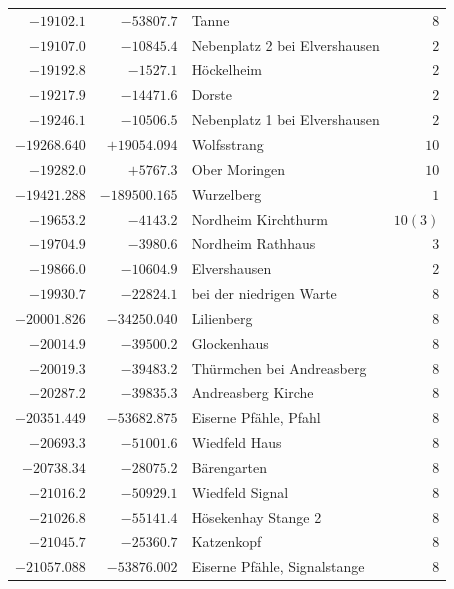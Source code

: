 \begin{center}
\begin{tabular}{r|r|p{170pt}|r}
\(-19102.1\)&\(-53807.7\)&Tanne&\(8\)\\
\(-19107.0\)&\(-10845.4\)&Nebenplatz 2 bei Elvershausen&\(2\)\\
\(-19192.8\)&\(-1527.1\)&Höckelheim&\(2\)\\
\(-19217.9\)&\(-14471.6\)&Dorste&\(2\)\\
\(-19246.1\)&\(-10506.5\)&Nebenplatz 1 bei Elvershausen&\(2\)\\
\(-19268.640\)&\(+19054.094\)&Wolfsstrang&\(10\)\\
\(-19282.0\)&\(+5767.3\)&Ober Moringen&\(10\)\\
\(-19421.288\)&\(-189500.165\)&Wurzelberg&\(1\)\\
\(-19653.2\)&\(-4143.2\)&Nordheim Kirchthurm&\(10 (3)\)\\
\(-19704.9\)&\(-3980.6\)&Nordheim Rathhaus&\(3\)\\
\(-19866.0\)&\(-10604.9\)&Elvershausen&\(2\)\\
\(-19930.7\)&\(-22824.1\)&bei der niedrigen Warte&\(8\)\\
\(-20001.826\)&\(-34250.040\)&Lilienberg&\(8\)\\
\(-20014.9\)&\(-39500.2\)&Glockenhaus&\(8\)\\
\(-20019.3\)&\(-39483.2\)&Thürmchen bei Andreasberg&\(8\)\\
\(-20287.2\)&\(-39835.3\)&Andreasberg Kirche&\(8\)\\
\(-20351.449\)&\(-53682.875\)&Eiserne Pfähle, Pfahl&\(8\)\\
\(-20693.3\)&\(-51001.6\)&Wiedfeld Haus&\(8\)\\
\(-20738.34\)&\(-28075.2\)&Bärengarten&\(8\)\\
\(-21016.2\)&\(-50929.1\)&Wiedfeld Signal&\(8\)\\
\(-21026.8\)&\(-55141.4\)&Hösekenhay Stange 2&\(8\)\\
\(-21045.7\)&\(-25360.7\)&Katzenkopf&\(8\)\\
\(-21057.088\)&\(-53876.002\)&Eiserne Pfähle, Signalstange&\(8\)\\
\hline\end{tabular}\endgroup\end{center}
